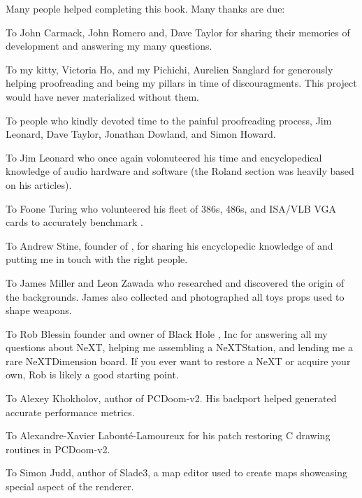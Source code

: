 Many people helped completing this book. Many thanks are due:\\
\par
To John Carmack, John Romero and, Dave Taylor for sharing their memories of \doom{} development and answering my many questions.\\
\par
To my kitty, Victoria Ho, and my Pichichi, Aurelien Sanglard for generously helping proofreading and being my pillars in time of discouragments. This project would have never materialized without them.\\ 
\par
To people who kindly devoted time to the painful proofreading process, Jim Leonard, Dave Taylor, Jonathan Dowland, and Simon Howard.\\
\par
To Jim Leonard who once again volonuteered his time and encyclopedical knowledge of audio hardware and software (the Roland section was heavily based on his articles).\\
\par
To Foone Turing who volunteered his fleet of 386s, 486s, and ISA/VLB VGA cards to accurately benchmark \doom{}.\\
\par
To Andrew Stine, founder of , for sharing his encyclopedic knowledge of \doom{} and putting me in touch with the right people.\\
\par
To James Miller and Leon Zawada who researched and discovered the origin of the backgrounds. James also collected and photographed all toys props used to shape \doom{} weapons.\\
\par
To Rob Blessin founder and owner of Black Hole , Inc for answering all my questions about NeXT, helping me assembling a NeXTStation, and lending me a rare NeXTDimension board. If you ever want to restore a NeXT or acquire your own, Rob is likely a good starting point.\\
\par
To Alexey Khokholov, author of PCDoom-v2. His backport helped generated accurate performance metrics.\\
\par
To Alexandre-Xavier Labont\'e-Lamoureux for his patch restoring C drawing routines in PCDoom-v2.\\
\par
To Simon Judd, author of Slade3, a map editor used to create maps showcasing special aspect of the renderer.\\
